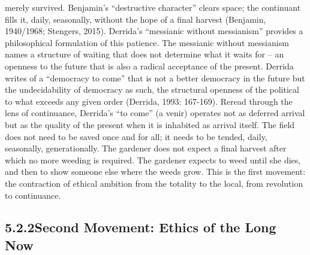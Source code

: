 merely survived. Benjamin’s “destructive character” clears space; the continuant fills it, daily, seasonally, without the hope of a final harvest (Benjamin, 1940/1968; Stengers, 2015). Derrida’s “messianic without messianism” provides a philosophical formulation of this patience. The messianic without messianism names a structure of waiting that does not determine what it waits for – an openness to the future that is also a radical acceptance of the present. Derrida writes of a “democracy to come” that is not a better democracy in the future but the undecidability of democracy as such, the structural openness of the political to what exceeds any given order (Derrida, 1993: 167-169). Reread through the lens of continuance, Derrida’s “to come” (a venir) operates not as deferred arrival but as the quality of the present when it is inhabited as arrival itself. The field does not need to be saved once and for all; it needs to be tended, daily, seasonally, generationally. The gardener does not expect a final harvest after which no more weeding is required. The gardener expects to weed until she dies, and then to show someone else where the weeds grow. This is the first movement: the contraction of ethical ambition from the totality to the local, from revolution to continuance.

\subsection{5.2.2\quad Second Movement: Ethics of the Long Now}

